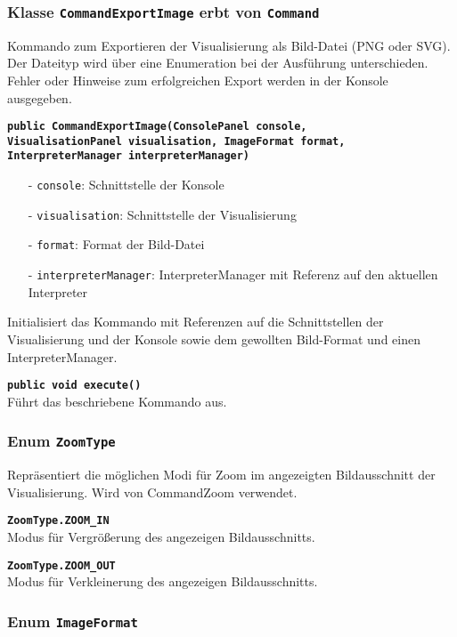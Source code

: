 \documentclass[parskip=full,11pt,twoside]{scrartcl}
\begin{document}
\subsubsection{Klasse \texttt{CommandExportImage} erbt von \texttt{Command}}

Kommando zum Exportieren der Visualisierung als Bild-Datei (PNG oder SVG). Der Dateityp wird über eine Enumeration bei der Ausführung unterschieden. Fehler oder Hinweise zum erfolgreichen Export werden in der Konsole ausgegeben.

\textbf{\texttt{public CommandExportImage(ConsolePanel console,\\VisualisationPanel visualisation, ImageFormat format,\\InterpreterManager interpreterManager)}}
\begin{itemize}[noitemsep]
	\item[-] \texttt{console}: Schnittstelle der Konsole
	\item[-] \texttt{visualisation}: Schnittstelle der Visualisierung
	\item[-] \texttt{format}: Format der Bild-Datei
	\item[-] \texttt{interpreterManager}: InterpreterManager mit Referenz auf den aktuellen Interpreter
\end{itemize}
Initialisiert das Kommando mit Referenzen auf die Schnittstellen der Visualisierung und der Konsole sowie dem gewollten Bild-Format und einen InterpreterManager.

\textbf{\texttt{public void execute()}}\\
Führt das beschriebene Kommando aus.

\subsubsection{Enum \texttt{ZoomType}}

Repräsentiert die möglichen Modi für Zoom im angezeigten Bildausschnitt der Visualisierung. Wird von CommandZoom verwendet.

\textbf{\texttt{ZoomType.ZOOM\_IN}}\\
Modus für Vergrößerung des angezeigen Bildausschnitts.

\textbf{\texttt{ZoomType.ZOOM\_OUT}}\\
Modus für Verkleinerung des angezeigen Bildausschnitts.

\subsubsection{Enum \texttt{ImageFormat}}
\end{document}
